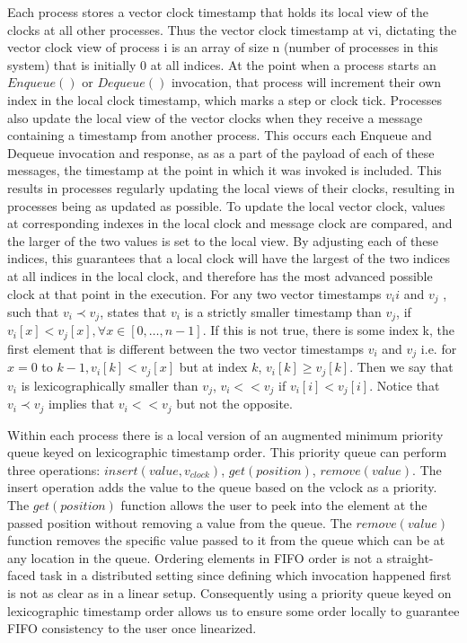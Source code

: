 \documentclass[a4paper,USenglish]{lipics-v2021} %
\begin{document}
Each process stores a vector clock timestamp that holds its local view of the clocks at all other processes. Thus the vector clock timestamp at vi, dictating the vector clock view of process i is an array of size n (number of processes in this system) that is initially 0 at all indices. At the point when a process starts an $Enqueue()$ or $Dequeue()$ invocation, that process will increment their own index in the local clock timestamp, which marks a step or clock tick.  Processes also update the local view of the vector clocks when they receive a message containing a timestamp from another process. This occurs each Enqueue and Dequeue invocation and response, as as a part of the payload of each of these messages, the timestamp at the point in which it was invoked is included. This results in processes regularly updating the local views of their clocks, resulting in processes being as updated as possible. To update the local vector clock, values at corresponding indexes in the local clock and message clock are compared, and the larger of the two values is set to the local view. By adjusting each of these indices, this guarantees that a local clock will have the largest of the two indices at all indices in the local clock, and therefore has the most advanced possible clock at that point in the execution.  For any two vector timestamps $v_ii$ and $v_j$ , such that $v_i \prec  v_j$, states that $v_i$ is a strictly smaller timestamp than $v_j$, if $v_i[x] < v_j[x],\forall x \in [0, \dots, n-1]$. If this is not true, there is some index k, the first element that is different between the two vector timestamps $v_i$ and $v_j$ i.e. for $x = 0$ to $k-1, v_i[k] < v_j[x]$ but at index $k$, $v_i[k] \geq v_j [k]$. Then we say that $v_i$ is lexicographically smaller than $v_j$, $v_i << v_j$ if $v_i[i] < v_j[i]$. Notice that $v_i \prec v_j$ implies that $v_i << v_j$ but not the opposite.

Within each process there is a local version of an augmented minimum priority queue keyed on lexicographic timestamp order. This priority queue can perform three operations: $insert(value, v_{clock})$, $get(position)$, $remove(value)$. The insert operation adds the value to the queue based on the vclock as a priority. The $get(position)$ function allows the user to peek into the element at the passed position without removing a value from the queue. The $remove(value)$ function removes the specific value passed to it from the queue which can be at any location in the queue. Ordering elements in FIFO order is not a straight-faced task in a distributed setting since defining which invocation happened first is not as clear as in a linear setup. Consequently using a priority queue keyed on lexicographic timestamp order allows us to ensure some order locally to guarantee FIFO consistency to the user once linearized.
\end{document}
